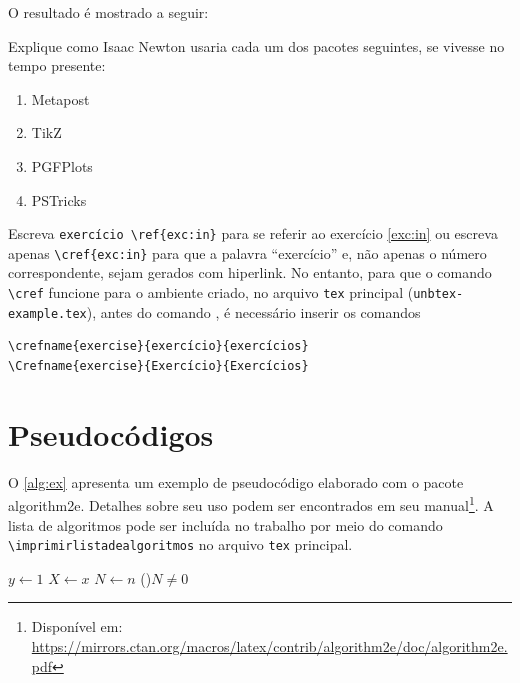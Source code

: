 \noindent O resultado é mostrado a seguir:

\begin{exercise}\label{exc:in}
    Explique como Isaac Newton usaria cada um dos pacotes seguintes,
    se vivesse no tempo presente:
    \begin{enumerate}[label=(\alph*)]
        \item Metapost
        \item TikZ
        \item PGFPlots
        \item PSTricks
    \end{enumerate}
\end{exercise}

Escreva \verb|exercício \ref{exc:in}| para se referir ao exercício \ref{exc:in} ou escreva apenas \verb|\cref{exc:in}| para que a palavra ``exercício'' e, não apenas o número correspondente, sejam gerados com hiperlink. No entanto, para que o comando \verb|\cref| funcione para o ambiente criado, no arquivo \texttt{tex} principal (\texttt{unbtex-example.tex}), antes do comando \verb||, é necessário inserir os comandos

\begin{verbatim}
\crefname{exercise}{exercício}{exercícios}
\Crefname{exercise}{Exercício}{Exercícios}
\end{verbatim}

\section{Pseudocódigos}

O \cref{alg:ex} apresenta um exemplo de pseudocódigo elaborado com o pacote \textsf{algorithm2e}. Detalhes sobre seu uso podem ser encontrados em seu manual\footnote{Disponível em: \url{https://mirrors.ctan.org/macros/latex/contrib/algorithm2e/doc/algorithm2e.pdf}}. A lista de algoritmos pode ser incluída no trabalho por meio do comando \verb|\imprimirlistadealgoritmos| no arquivo \texttt{tex} principal.

\begin{algorithm}[htb]
\caption{Exemplo de pseudocódigo}\label{alg:ex}
$y \gets 1$\;
$X \gets x$\;
$N \gets n$\;
\While(){$N \neq 0$}{
}
\end{algorithm}

